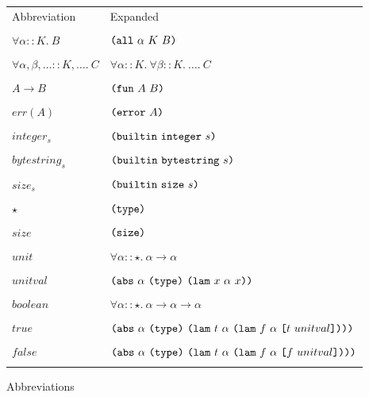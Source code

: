 \documentclass[../main.tex]{subfiles}
\begin{document}
\begin{figure*}[t]
    \footnotesize

    \begin{tabular}{ll}
        \textrm{Abbreviation} & \textrm{Expanded}\\\\

        $\forall \alpha :: K.\ B$ & \(\allT{\alpha}{K}{B}\)\\\\

        $\forall \alpha, \beta, \ldots :: K, \ldots.\ C$ & \(\forall \alpha :: K.\ \forall \beta :: K.\ \ldots.\ C\)\\\\

        $A \to B$ & \(\funT{A}{B}\)\\\\

        $err(A)$ & \(\error{A}\)\\\\

        $integer_s$ & \(\builtinT{\conIntegerType{}}{s}\)\\\\

        $bytestring_s$ & \(\builtinT{\conBytestringType{}}{s}\)\\\\

        $size_s$ & \(\builtinT{\conSizeType{}}{s}\)\\\\

        $\star$ & \(\typeK{}\)\\\\

        $size$ & \(\sizeK{}\)\\\\

        $unit$ & \(\forall \alpha :: \star.\ \alpha \to \alpha\)\\\\

        $unitval$ & \(\abs{\alpha}{\typeK{}}{\lam{x}{\alpha}{x}}\)\\\\

        $boolean$ & \(\forall \alpha :: \star.\ \alpha \to \alpha \to \alpha\)\\\\

        $true$ & \(\abs{\alpha}{\typeK{}}{\lam{t}{\alpha}{\lam{f}{\alpha}{\app{t}{unitval}}}}\)\\\\

        $false$ & \(\abs{\alpha}{\typeK{}}{\lam{t}{\alpha}{\lam{f}{\alpha}{\app{f}{unitval}}}}\)\\\\

    \end{tabular}

    \caption{Abbreviations}
    \label{fig:Plutus_core_type_abbreviations}
\end{figure*}
\end{document}
